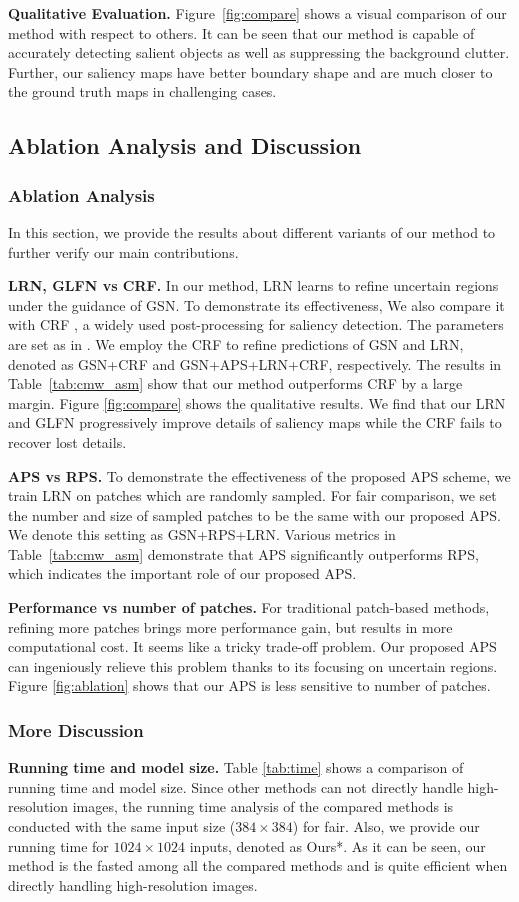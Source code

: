 \textbf{Qualitative Evaluation.} Figure~\ref{fig:compare} shows a visual comparison of our method with respect to others. It can be seen that our method is capable of accurately detecting salient objects as well as suppressing the background clutter. Further, our saliency maps have better boundary shape and are much closer to the ground truth maps in challenging cases.
\subsection{ Ablation Analysis and Discussion}
\subsubsection{Ablation Analysis} In this section, we provide the results about different variants of our method to further verify our main contributions.

\textbf{LRN, GLFN vs CRF.} In our method, LRN learns to refine uncertain regions under the guidance of GSN. To demonstrate its effectiveness, We also compare it with CRF \cite{krahenbuhl2011efficient}, a widely used post-processing for saliency detection. The parameters are set as in \cite{hou2017deeply}. We employ the CRF to refine predictions of GSN and LRN, denoted as GSN+CRF and GSN+APS+LRN+CRF, respectively. The results in Table~\ref{tab:cmw_asm} show that our method outperforms CRF by a large margin. Figure \ref{fig:compare} shows the qualitative results. We find that our LRN and GLFN progressively improve details of saliency maps while the CRF fails to recover lost details.

\textbf{APS vs RPS.} To demonstrate the effectiveness of the proposed APS scheme, we train LRN on patches which are randomly sampled. For fair comparison, we set the number and size of sampled patches to be the same with our proposed APS. We denote this setting as GSN+RPS+LRN. Various metrics in Table~\ref{tab:cmw_asm}  demonstrate that APS significantly outperforms RPS, which indicates the important role of our proposed APS.

\textbf{Performance vs number of patches.} For traditional patch-based methods, refining more patches brings more performance gain, but results in more computational cost. It seems like a tricky trade-off problem. Our proposed APS can ingeniously relieve this problem thanks to its focusing on  uncertain regions. Figure \ref{fig:ablation} shows that our APS is less sensitive to number of patches.

\subsubsection{More Discussion}
\textbf{Running time and model size.} Table \ref{tab:time} shows a comparison of running time and model size. Since other methods can not directly handle high-resolution images, the running time analysis of the compared methods is conducted with the same input size ($384\times384$) for fair. Also, we provide our running time for $1024\times1024$ inputs, denoted as Ours*. As it can be seen, our method is the fasted among all the compared methods and is quite efficient when directly handling high-resolution images.

